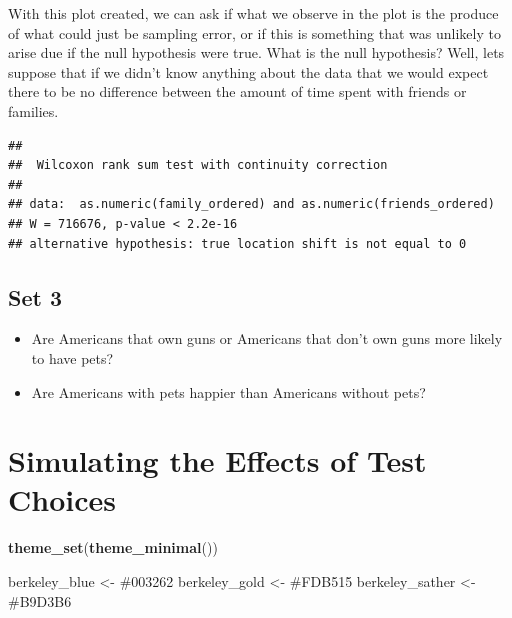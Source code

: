 \documentclass[
]{book}
\newenvironment{Shaded}{\begin{snugshade}}{\end{snugshade}}
\newcommand{\AttributeTok}[1]{\textcolor[rgb]{0.13,0.29,0.53}{#1}}
\newcommand{\ConstantTok}[1]{\textcolor[rgb]{0.56,0.35,0.01}{#1}}
\newcommand{\DocumentationTok}[1]{\textcolor[rgb]{0.56,0.35,0.01}{\textbf{\textit{#1}}}}
\newcommand{\FunctionTok}[1]{\textcolor[rgb]{0.13,0.29,0.53}{\textbf{#1}}}
\newcommand{\NormalTok}[1]{#1}
\newcommand{\OtherTok}[1]{\textcolor[rgb]{0.56,0.35,0.01}{#1}}
\newcommand{\SpecialCharTok}[1]{\textcolor[rgb]{0.81,0.36,0.00}{\textbf{#1}}}
\newcommand{\StringTok}[1]{\textcolor[rgb]{0.31,0.60,0.02}{#1}}
\providecommand{\tightlist}{%
  \setlength{\itemsep}{0pt}\setlength{\parskip}{0pt}}
\theoremstyle{definition}
\theoremstyle{definition}
\theoremstyle{definition}
\theoremstyle{definition}
\theoremstyle{remark}
\begin{document}
With this plot created, we can ask if what we observe in the plot is the produce of what could just be sampling error, or if this is something that was unlikely to arise due if the null hypothesis were true. What is the null hypothesis? Well, lets suppose that if we didn't know anything about the data that we would expect there to be no difference between the amount of time spent with friends or families.

\begin{Shaded}
\end{Shaded}

\begin{verbatim}
## 
##  Wilcoxon rank sum test with continuity correction
## 
## data:  as.numeric(family_ordered) and as.numeric(friends_ordered)
## W = 716676, p-value < 2.2e-16
## alternative hypothesis: true location shift is not equal to 0
\end{verbatim}

\hypertarget{set-3}{%
\subsection{Set 3}\label{set-3}}

\begin{itemize}
\tightlist
\item
  Are Americans that own guns or Americans that don't own guns more likely to have pets?
\item
  Are Americans with pets happier than Americans without pets?
\end{itemize}

\hypertarget{simulating-the-effects-of-test-choices}{%
\section{Simulating the Effects of Test Choices}\label{simulating-the-effects-of-test-choices}}

\begin{Shaded}
\begin{Highlighting}[]
\FunctionTok{theme\_set}\NormalTok{(}\FunctionTok{theme\_minimal}\NormalTok{())}

\NormalTok{berkeley\_blue   }\OtherTok{\textless{}{-}} \StringTok{\textquotesingle{}\#003262\textquotesingle{}}
\NormalTok{berkeley\_gold   }\OtherTok{\textless{}{-}} \StringTok{\textquotesingle{}\#FDB515\textquotesingle{}}
\NormalTok{berkeley\_sather }\OtherTok{\textless{}{-}} \StringTok{\textquotesingle{}\#B9D3B6\textquotesingle{}}
\end{Highlighting}
\end{Shaded}
\end{document}
